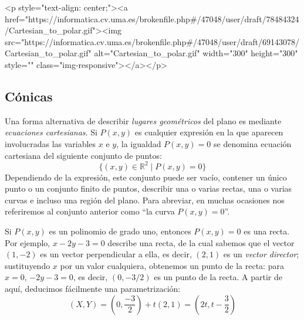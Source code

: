 \begin{rawhtml}
<p style="text-align: center;"><a href="https://informatica.cv.uma.es/brokenfile.php#/47048/user/draft/78484324/Cartesian_to_polar.gif"><img src="https://informatica.cv.uma.es/brokenfile.php#/47048/user/draft/69143078/Cartesian_to_polar.gif" alt="Cartesian_to_polar.gif" width="300" height="300" style="" class="img-responsive"></a></p>
\end{rawhtml}



\subsection{Cónicas}

Una forma alternativa de describir \emph{lugares geométricos} del plano es mediante \emph{ecuaciones cartesianas}.
Si $P(x,y)$ es cualquier expresión en la que aparecen involucradas las variables $x$ e $y$, la igualdad $P(x,y)=0$ se denomina ecuación cartesiana del siguiente conjunto de puntos:
\[
\{(x,y)\in\mathbb{R}^2\mid P(x,y)=0\}
\]
Dependiendo de la expresión, este conjunto puede ser vacío, contener un único punto o un conjunto finito de puntos, describir una o varias rectas, una o varias curvas e incluso una región del plano.
Para abreviar, en muchas ocasiones nos referiremos al conjunto anterior como ``la curva $P(x,y)=0$''.
%
\begin{ejemplo}
Si $P(x,y)$ es un polinomio de grado uno, entonces $P(x,y)=0$ es una recta.
Por ejemplo, $x-2y-3=0$ describe una recta, de la cual sabemos que el vector $(1,-2)$ es un vector perpendicular a ella, es decir, $(2,1)$ es un \emph{vector director};
sustituyendo $x$ por un valor cualquiera, obtenemos un punto de la recta: para $x=0$, $-2y-3=0$, es decir, $(0,-3/2)$ es un punto de la recta. A partir de aquí, deducimos fácilmente una parametrización:
\begin{equation}
(X,Y)=\left(0,\frac{-3}2\right)+t(2,1)=\left(2t,t-\frac32\right)\tag*{\fej}
\end{equation}
\end{ejemplo}

